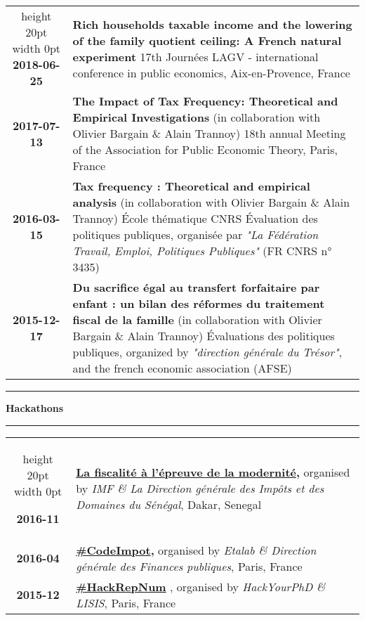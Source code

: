 \documentclass[a4paper,11pt]{article} %
\newcommand\espace{\vrule height 20pt width 0pt}
\newcommand{\titre}[1]{%
	\begin{center}
	\rule{\textwidth}{1pt}
	\par\vspace{0.1cm}
        \textbf{\large #1}
	\par\rule{\textwidth}{1pt}
	\end{center}
	}
\begin{document}
\begin{tabular}{c@{ :  }p{}}
\espace
\textbf{2018-06-25} & \textbf{Rich households taxable income and the lowering of the family quotient ceiling: A French natural experiment}
17th Journées LAGV - international conference in public economics, Aix-en-Provence, France \\
\textbf{2017-07-13} & \textbf{ The Impact of Tax Frequency: Theoretical and Empirical Investigations} (in collaboration with Olivier Bargain \& Alain Trannoy) 
18th annual Meeting of the Association for Public Economic Theory, Paris, France \\
\textbf{2016-03-15} & \textbf{ Tax frequency : Theoretical and empirical analysis} (in collaboration with Olivier Bargain \& Alain Trannoy)  École thématique CNRS Évaluation des politiques publiques, organisée par \emph{"La Fédération Travail, Emploi, Politiques Publiques"} (FR CNRS n° 3435) \\
\textbf{2015-12-17} & \textbf{ Du sacrifice égal au transfert forfaitaire par enfant : un bilan des réformes du traitement fiscal de la famille} (in collaboration with Olivier Bargain \& Alain Trannoy)  Évaluations des politiques publiques, organized by \emph{"direction générale du Trésor"}, and the french economic association (AFSE) \\
\end{tabular}


\titre{Hackathons}

\begin{tabular}{c@{ :  }p{}}
\espace



\textbf{2016-11} & \textbf{
\href{https://www.etalab.gouv.fr/openfisca-au-hackathon-sur-la-fiscalite-de-dakar}{La fiscalité à l'épreuve de la modernité},} organised by \emph{IMF \& La Direction générale des Impôts et des Domaines du Sénégal}, Dakar, Senegal \\
\textbf{2016-04} & \textbf{
\href{https://www.etalab.gouv.fr/codeimpot-un-hackathon-autour-de-louverture-du-code-source-du-calculateur-impots}{ \#CodeImpot},} organised by \emph{Etalab \& Direction générale des Finances publiques}, Paris, France \\
\textbf{2015-12} & \textbf{ 
\href{https://www.data.gouv.fr/en/reuses/hackrepnum-un-hackathon-recherche-autour-de-la-loi-sur-le-numerique/}
{\#HackRepNum}} , organised by \emph{HackYourPhD \& LISIS}, Paris, France \\


\end{tabular}
\newpage
\end{document}
